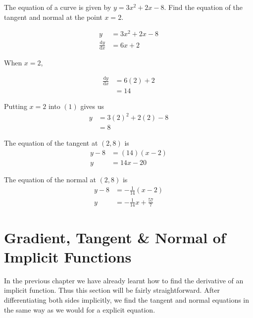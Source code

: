 \documentclass[11pt,a4paper]{book}
\begin{document}
\newpage{}

\begin{example}

The equation of a curve is given by $y=3x^{2}+2x-8$. Find the equation of the tangent and normal at the point $x=2$.

\Solution

\begin{align*}
y & =3x^{2}+2x-8\tag{1}\\
\frac{\mathrm{d}y}{\mathrm{d}x} & =6x+2
\end{align*}


When $x=2$,

\begin{align*}
\frac{\mathrm{d}y}{\mathrm{d}x} & =6\left(2\right)+2\\
 & =14
\end{align*}

Putting $x=2$ into $(1)$ gives us
\begin{align*}
y & =3\left(2\right)^{2}+2\left(2\right)-8\\
 & =8
\end{align*}

The equation of the tangent at $\left(2,8\right)$ is
\begin{align*}
y-8 & =\left(14\right)\left(x-2\right)\\
y & =14x-20
\end{align*}

The equation of the normal at $\left(2,8\right)$ is
\begin{align*}
y-8 & =-\frac{1}{14}\left(x-2\right)\\
y & =-\frac{1}{14}x+\frac{57}{7}
\end{align*}

\end{example}

\section{Gradient, Tangent \& Normal of Implicit Functions}

In the previous chapter we have already learnt how to find the derivative of an implicit function. Thus this section will be fairly straightforward. After differentiating both sides implicitly, we find the tangent and normal equations in the same way as we would for a explicit equation.

\newpage
\end{document}

